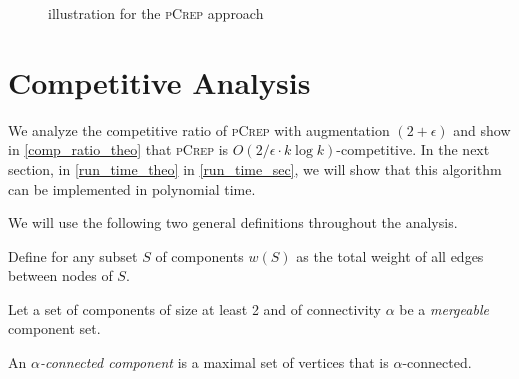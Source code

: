 \documentclass[a4paper,UKenglish,cleveref, autoref, thm-restate,authorcolumns]{lipics-v2019}
\newcommand{\adjDel}{\textsc{pCrep}}
\newcommand{\request}[3]{\draw (axis cs:#3,#1) -- node[left]{} (axis cs:#3,#2);}
\begin{document}
\begin{figure}
	\centering
	\caption{illustration for the \adjDel{} approach}\label{exOldCrep}
	
\end{figure}		

\section{Competitive Analysis}
\label{comp_analysis_section}

We analyze the competitive ratio of \adjDel{} with augmentation $(2+\epsilon)$ and show in \cref{comp_ratio_theo} that \adjDel{} is $O(2/\epsilon\cdot k\log k)$-competitive.
In the next section, in \cref{run_time_theo} in \cref{run_time_sec}, 
we will show that this algorithm can be implemented in polynomial time.

We will use the following two general definitions 
throughout the analysis.

\begin{definition}
	Define for any subset $S$ of components $w(S)$ as the total weight of all edges between nodes of $S$.
\end{definition}

\begin{definition}
	Let a set of components of size at least 2 and of connectivity $\alpha$ be a \textit{mergeable} component set.	
\end{definition}

\begin{definition}
	An $\alpha$\textit{-connected component} is a maximal set of vertices that is $\alpha$-connected.
\end{definition}
\end{document}

